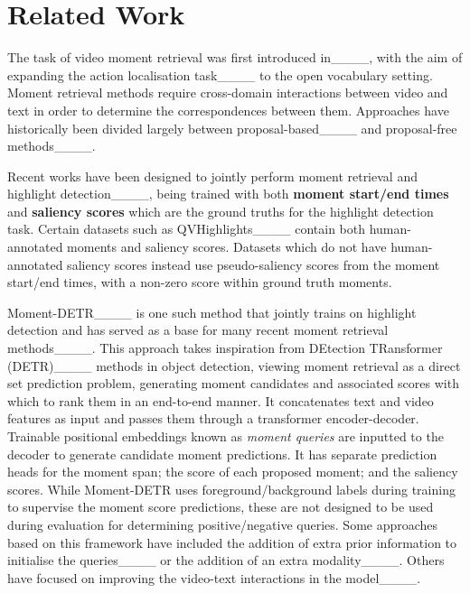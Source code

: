 \section{Related Work}
\label{sec:related_work}
The task of video moment retrieval was first introduced in____, with the aim of expanding the action localisation task____ to the open vocabulary setting. Moment retrieval methods require cross-domain interactions between video and text in order to determine the correspondences between them. Approaches have historically been divided largely between proposal-based____ and proposal-free methods____. 

Recent works have been designed to jointly perform moment retrieval and highlight detection____, being trained with both \textbf{moment start/end times} and \textbf{saliency scores} which are the ground truths for the highlight detection task. Certain datasets such as QVHighlights____ contain both human-annotated moments and saliency scores. Datasets which do not have human-annotated saliency scores instead use pseudo-saliency scores from the moment start/end times, with a non-zero score within ground truth moments.

Moment-DETR____ is one such method that jointly trains on highlight detection and has served as a base for many recent moment retrieval methods____. %
This approach takes inspiration from DEtection TRansformer (DETR)____ methods in object detection, viewing moment retrieval as a direct set prediction problem, generating moment candidates and associated scores with which to rank them in an end-to-end manner. It concatenates text and video features as input and passes them through a transformer encoder-decoder. Trainable positional embeddings known as \textit{moment queries} are inputted to the decoder to generate candidate moment predictions. It has separate prediction heads for the moment span; the score of each proposed moment; and the saliency scores. While Moment-DETR uses foreground/background labels during training to supervise the moment score predictions, these are not designed to be used during evaluation for determining positive/negative queries.
Some approaches based on this framework have included the addition of extra prior information to initialise the queries____ or the addition of an extra modality____. Others have focused on improving the video-text interactions in the model____.%

